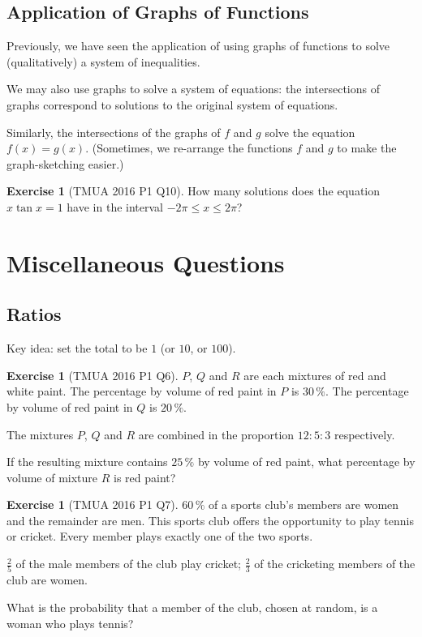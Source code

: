 \documentclass[11pt]{article}
\theoremstyle{definition}
\newtheorem{example}[theorem]{Exercise}
\theoremstyle{remark}
\newcommand{\pqty}[1]{\left(#1\right)}
\newcommand{\flatfrac}[2]{\frac{#1}{#2}}
\newcommand{\SI}[2]{#1\,\text{#2}}
\newcommand{\percent}{\%}
\begin{document}
\subsection{Application of Graphs of Functions}\label{tmua-5-subsection-005}

Previously, we have seen the application of using graphs of functions to solve (qualitatively) a system of inequalities.

We may also use graphs to solve a system of equations: the intersections of graphs correspond to solutions to the original system of equations.

Similarly, the intersections of the graphs of \(f\) and \(g\) solve the equation \(f\pqty{x} = g\pqty{x}\). (Sometimes, we re-arrange the functions \(f\) and \(g\) to make the graph-sketching easier.)

\begin{example}[TMUA 2016 P1 Q10]\label{tmua-5-unit-012}
    How many solutions does the equation \(x \tan x = 1\) have in the interval \(-2 \pi \leq x \leq 2\pi\)?
\end{example}

\section{Miscellaneous Questions}\label{tmua-5-section-002}

\subsection{Ratios}\label{tmua-5-subsection-006}

Key idea: set the total to be \(1\) (or \(10\), or \(100\)).

\begin{example}[TMUA 2016 P1 Q6]\label{tmua-5-unit-013}
    \(P\), \(Q\) and \(R\) are each mixtures of red and white paint. The percentage by volume of red paint in \(P\) is \(\SI{30}{\percent}\). The percentage by volume of red paint in \(Q\) is \(\SI{20}{\percent}\).

    The mixtures \(P\), \(Q\) and \(R\) are combined in the proportion \(12 : 5 : 3\) respectively.

    If the resulting mixture contains \(\SI{25}{\percent}\) by volume of red paint, what percentage by volume of mixture \(R\) is red paint?
\end{example}

\begin{example}[TMUA 2016 P1 Q7]\label{tmua-5-unit-014}
    \(\SI{60}{\percent}\) of a sports club's members are women and the remainder are men. This sports club offers the opportunity to play tennis or cricket. Every member plays exactly one of the two sports.

    \(\flatfrac{2}{5}\) of the male members of the club play cricket; \(\flatfrac{2}{3}\) of the cricketing members of the club are women.

    What is the probability that a member of the club, chosen at random, is a woman who plays tennis?
\end{example}
\end{document}
